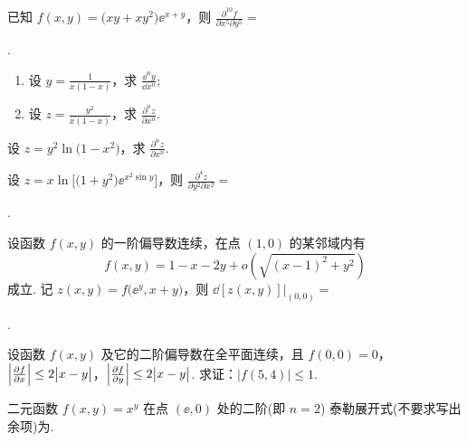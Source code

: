 	\begin{ti}
		已知 $f(x,y) = \bigl( xy + xy^{2} \bigr) \ee^{x + y}$，则 $\frac{\partial^{10}f}{\partial x^{5} \partial y^{5}} = $\htwo

		\noindent{}.
	\end{ti}

	\begin{ti}
		\begin{enumerate}
			\item 设 $y = \frac{1}{x(1 - x)}$，求 $\frac{\dd^{n}y}{\dd{x^{n}}}$;
			\item 设 $z = \frac{y^{2}}{x(1 - x)}$，求 $\frac{\partial^{n}z}{\partial x^{n}}$.
		\end{enumerate}
	\end{ti}

	\begin{ti}
		设 $z = y^{2} \ln \bigl( 1 - x^{2} \bigr)$，求 $\frac{\partial^{n}z}{\partial x^{n}}$.
	\end{ti}

	\begin{ti}
		设 $z = x \ln \bigl[ \bigl( 1 + y^{2} \bigr) \ee^{x^{2} \sin y} \bigr]$，则 $\frac{\partial^{4}z}{\partial y^{2} \partial x^{2}} = $\htwo

		\noindent\hone{4}.
	\end{ti}

	\begin{ti}
		设函数 $f(x,y)$ 的一阶偏导数连续，在点 $(1,0)$ 的某邻域内有
		\[
			f(x,y) = 1 - x - 2y + o\left( \sqrt{(x - 1)^{2} + y^{2}} \right)
		\]
		成立. 记 $z(x,y) = f\bigl( \ee^{y}, x + y \bigr)$，则 $\dd{[z(x,y)]}|_{(0,0)} = $\htwo

		\noindent{}.
	\end{ti}

	\begin{ti}
		设函数 $f(x,y)$ 及它的二阶偏导数在全平面连续，且 $f(0,0) = 0$，$\Bigl| \frac{\partial f}{\partial x} \Bigr| \leq 2 \bigl|x - y\bigr|$，$\Bigl| \frac{\partial f}{\partial y} \Bigr| \leq 2 \bigl|x - y\bigr|$. 求证：$\bigl|f(5,4)\bigr| \leq 1$.
	\end{ti}

	\begin{ti}
		二元函数 $f(x,y) = x^{y}$ 在点 $(\ee,0)$ 处的二阶(即 $n = 2$) 泰勒展开式(不要求写出余项)为\htwo.
	\end{ti}